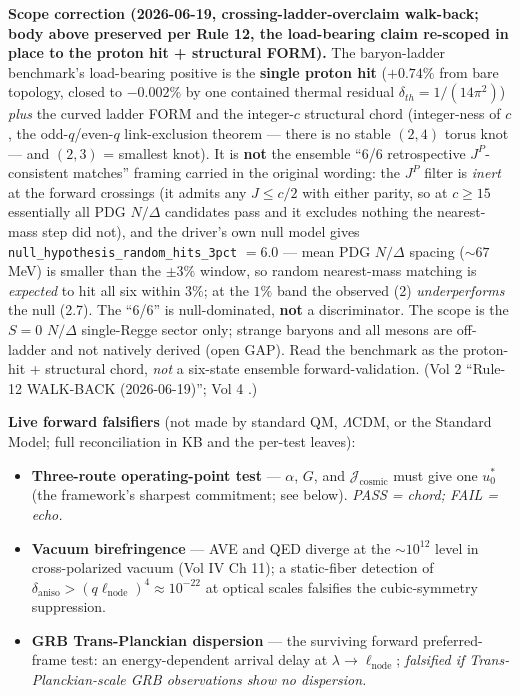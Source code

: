 \noindent \textbf{Scope correction (2026-06-19, crossing-ladder-overclaim walk-back; body above preserved per Rule 12, the load-bearing claim re-scoped in place to the proton hit + structural FORM).} The baryon-ladder benchmark's load-bearing positive is the \textbf{single proton hit} ($+0.74\%$ from bare topology, closed to $-0.002\%$ by one contained thermal residual $\delta_{th} = 1/(14\pi^2)$) \emph{plus} the curved ladder FORM and the integer-$c$ structural chord (integer-ness of $c$, the odd-$q$/even-$q$ link-exclusion theorem --- there is no stable $(2,4)$ torus knot --- and $(2,3)$ = smallest knot). It is \textbf{not} the ensemble ``6/6 retrospective $J^P$-consistent matches'' framing carried in the original wording: the $J^P$ filter is \emph{inert} at the forward crossings (it admits any $J \le c/2$ with either parity, so at $c \ge 15$ essentially all PDG $N/\Delta$ candidates pass and it excludes nothing the nearest-mass step did not), and the driver's own null model gives \texttt{null\_hypothesis\_random\_hits\_3pct} $= 6.0$ --- mean PDG $N/\Delta$ spacing ($\sim 67$ MeV) is smaller than the $\pm 3\%$ window, so random nearest-mass matching is \emph{expected} to hit all six within $3\%$; at the $1\%$ band the observed (2) \emph{underperforms} the null (2.7). The ``6/6'' is null-dominated, \textbf{not} a discriminator. The scope is the $S=0$ $N/\Delta$ single-Regge sector only; strange baryons and all mesons are off-ladder and not natively derived (open GAP). Read the benchmark as the proton-hit + structural chord, \emph{not} a six-state ensemble forward-validation. (Vol 2  ``Rule-12 WALK-BACK (2026-06-19)''; Vol 4 .)

\noindent \textbf{Live forward falsifiers} (not made by standard QM, $\Lambda$CDM, or the Standard Model; full reconciliation in KB  and the per-test leaves):
\begin{itemize}\itemsep 0pt
    \item \textbf{Three-route operating-point test} --- $\alpha$, $G$, and $\mathcal{J}_{\text{cosmic}}$ must give one $u_0^*$ (the framework's sharpest commitment; see below). \emph{PASS = chord; FAIL = echo.}
    \item \textbf{Vacuum birefringence} --- AVE and QED diverge at the $\sim 10^{12}$ level in cross-polarized vacuum (Vol IV Ch 11); a static-fiber detection of $\delta_{\text{aniso}} > (q\ell_{\text{node}})^4 \approx 10^{-22}$ at optical scales falsifies the cubic-symmetry suppression.
    \item \textbf{GRB Trans-Planckian dispersion} --- the surviving forward preferred-frame test: an energy-dependent arrival delay at $\lambda \to \ell_{\text{node}}$; \emph{falsified if Trans-Planckian-scale GRB observations show no dispersion.}
\end{itemize}


